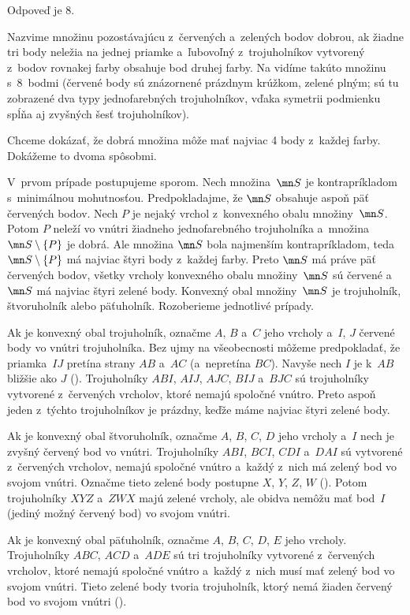 {%
Odpoveď je 8.

Nazvime množinu pozostávajúcu z~červených a~zelených bodov dobrou, ak žiadne tri body neležia na jednej priamke a~ľubovoľný z~trojuholníkov vytvorený z~bodov rovnakej farby obsahuje bod druhej farby. Na \obr{} vidíme takúto množinu s~8~bodmi (červené body sú znázornené prázdnym krúžkom, zelené plným; sú tu zobrazené dva typy jednofarebných trojuholníkov, vďaka symetrii podmienku spĺňa aj zvyšných šesť trojuholníkov).
%

Chceme dokázať, že dobrá množina môže mať najviac 4 body z~každej farby. Dokážeme to dvoma spôsobmi.

V~prvom prípade postupujeme sporom. Nech množina~$\mn S$ je kontrapríkladom s~minimálnou mohutnosťou. Predpokladajme, že $\mn S$ obsahuje aspoň päť červených bodov. Nech $P$ je nejaký vrchol z~konvexného obalu množiny~$\mn S$. Potom $P$ neleží vo vnútri žiadneho jednofarebného trojuholníka a~množina $\mn S \setminus \{P\}$ je dobrá. Ale množina $\mn S$ bola najmenším kontrapríkladom, teda  $\mn S \setminus \{P\}$ má najviac štyri body z~každej farby. Preto $\mn S$ má práve päť červených bodov, všetky vrcholy konvexného obalu množiny~$\mn S$ sú červené a~$\mn S$ má najviac štyri zelené body. Konvexný obal množiny~$\mn S$ je trojuholník, štvoruholník alebo päťuholník. Rozoberieme jednotlivé prípady.

Ak je konvexný obal trojuholník, označme $A$, $B$ a~$C$ jeho vrcholy a~$I$, $J$ červené body vo vnútri trojuholníka. Bez ujmy na všeobecnosti môžeme predpokladať, že priamka~$IJ$ pretína strany $AB$ a~$AC$ (a~nepretína $BC$). Navyše nech $I$ je k~$AB$ bližšie ako $J$ (\obr). Trojuholníky $ABI$, $AIJ$, $AJC$, $BIJ$ a~$BJC$ sú trojuholníky vytvorené z~červených vrcholov, ktoré nemajú spoločné vnútro. Preto aspoň jeden z~týchto trojuholníkov je prázdny, keďže máme najviac štyri zelené body.
%

Ak je konvexný obal štvoruholník, označme $A$, $B$, $C$, $D$ jeho vrcholy a~$I$ nech je zvyšný červený bod vo vnútri. Trojuholníky $ABI$, $BCI$, $CDI$ a~$DAI$ sú vytvorené z~červených vrcholov, nemajú spoločné vnútro a~každý z~nich má zelený bod vo svojom vnútri. Označme tieto zelené body postupne $X$, $Y$, $Z$, $W$ (\obr). Potom trojuholníky $XYZ$ a~$ZWX$ majú zelené vrcholy, ale obidva nemôžu mať bod~$I$ (jediný možný červený bod) vo svojom vnútri.
%

Ak je konvexný obal päťuholník, označme $A$, $B$, $C$, $D$, $E$ jeho vrcholy. Trojuholníky $ABC$, $ACD$
a~$ADE$ sú tri trojuholníky vytvorené z~červených vrcholov, ktoré nemajú spoločné vnútro a~každý z~nich musí mať zelený bod vo svojom vnútri. Tieto zelené body tvoria trojuholník, ktorý nemá žiaden červený bod vo svojom vnútri (\obr).
%

}
